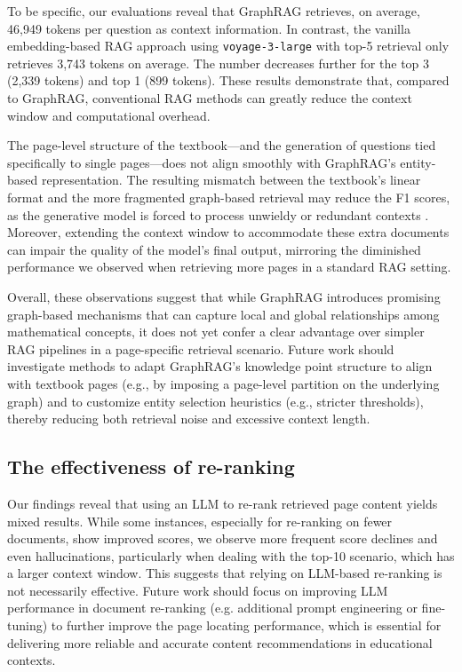 \documentclass[runningheads]{llncs}
\begin{document}
To be specific, our evaluations reveal that GraphRAG retrieves, on average, 46,949 tokens per question as context information. In contrast, the vanilla embedding-based RAG approach using \texttt{voyage-3-large} with top-5 retrieval only retrieves 3,743 tokens on average. The number decreases further for the top 3 (2,339 tokens) and top 1 (899 tokens). These results demonstrate that, compared to GraphRAG, conventional RAG methods can greatly reduce the context window and computational overhead.


The page-level structure of the textbook—and the generation of questions tied specifically to single pages—does not align smoothly with GraphRAG's entity-based representation. The resulting mismatch between the textbook's linear format and the more fragmented graph-based retrieval may reduce the F1 scores, as the generative model is forced to process unwieldy or redundant contexts \cite{guo2024graphrag,zhang2025survey}. Moreover, extending the context window to accommodate these extra documents can impair the quality of the model's final output, mirroring the diminished performance we observed when retrieving more pages in a standard RAG setting.

Overall, these observations suggest that while GraphRAG introduces promising graph-based mechanisms that can capture local and global relationships among mathematical concepts, it does not yet confer a clear advantage over simpler RAG pipelines in a page-specific retrieval scenario. Future work should investigate methods to adapt GraphRAG's knowledge point structure to align with textbook pages (e.g., by imposing a page-level partition on the underlying graph) and to customize entity selection heuristics (e.g., stricter thresholds), thereby reducing both retrieval noise and excessive context length.

\subsection{The effectiveness of re-ranking}

Our findings reveal that using an LLM to re-rank retrieved page content yields mixed results. While some instances, especially for re-ranking on fewer documents, show improved scores, we observe more frequent score declines and even hallucinations, particularly when dealing with the top-10 scenario, which has a larger context window. This suggests that relying on LLM-based re-ranking is not necessarily effective. Future work should focus on improving LLM performance in document re-ranking (e.g. additional prompt engineering or fine-tuning) to further improve the page locating performance, which is essential for delivering more reliable and accurate content recommendations in educational contexts.
\end{document}

